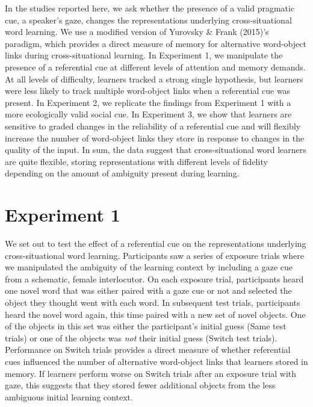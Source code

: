 \documentclass[authoryear, review]{elsarticle}
\begin{document}
In the studies reported here, we ask whether the presence of a valid
pragmatic cue, a speaker's gaze, changes the representations underlying
cross-situational word learning. We use a modified version of Yurovsky
\& Frank (2015)'s paradigm, which provides a direct measure of memory
for alternative word-object links during cross-situational learning. In
Experiment 1, we manipulate the presence of a referential cue at
different levels of attention and memory demands. At all levels of
difficulty, learners tracked a strong single hypothesis, but learners
were less likely to track multiple word-object links when a referential
cue was present. In Experiment 2, we replicate the findings from
Experiment 1 with a more ecologically valid social cue. In Experiment 3,
we show that learners are sensitive to graded changes in the reliability
of a referential cue and will flexibly increase the number of
word-object links they store in response to changes in the quality of
the input. In sum, the data suggest that cross-situational word learners
are quite flexible, storing representations with different levels of
fidelity depending on the amount of ambiguity present during learning.

\section{Experiment 1}\label{experiment-1}

We set out to test the effect of a referential cue on the
representations underlying cross-situational word learning. Participants
saw a series of exposure trials where we manipulated the ambiguity of
the learning context by including a gaze cue from a schematic, female
interlocutor. On each exposure trial, participants heard one novel word
that was either paired with a gaze cue or not and selected the object
they thought went with each word. In subsequent test trials,
participants heard the novel word again, this time paired with a new set
of novel objects. One of the objects in this set was either the
participant's initial guess (Same test trials) or one of the objects was
\emph{not} their initial guess (Switch test trials). Performance on
Switch trials provides a direct measure of whether referential cues
influenced the number of alternative word-object links that learners
stored in memory. If learners perform worse on Switch trials after an
exposure trial with gaze, this suggests that they stored fewer
additional objects from the less ambiguous initial learning context.
\end{document}
